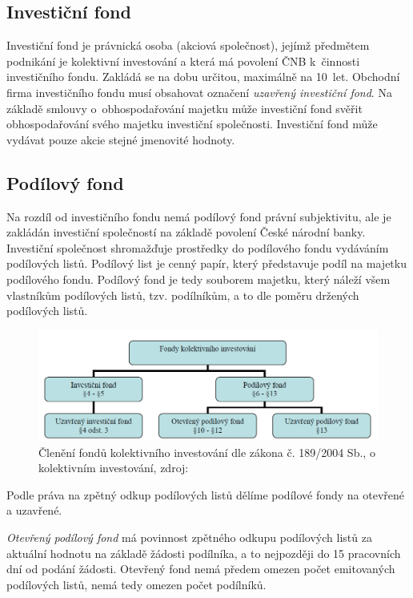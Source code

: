 \documentclass[a4paper,12pt]{article}
\begin{document}
\subsection{Investiční fond}
Investiční fond je právnická osoba (akciová společnost), jejímž předmětem podnikání je kolektivní investování a která má povolení ČNB k~činnosti investičního fondu. Zakládá se na dobu určitou, maximálně na 10~let. Obchodní firma investičního fondu musí obsahovat označení \emph{uzavřený investiční fond}. Na základě smlouvy o~obhospodařování majetku může investiční fond svěřit obhospodařování svého majetku investiční společnosti. Investiční fond může vydávat pouze akcie stejné jmenovité hodnoty.

\subsection{Podílový fond}
Na rozdíl od investičního fondu nemá podílový fond právní subjektivitu, ale je zakládán investiční společností na základě povolení České národní banky. Investiční společnost shromažďuje prostředky do podílového fondu vydáváním podílových listů. Podílový list je cenný papír, který představuje podíl na majetku podílového fondu. Podílový fond je tedy souborem majetku, který náleží všem vlastníkům podílových listů, tzv. podílníkům, a to dle poměru držených podílových listů.  

\begin{figure}[htb]
\centering
\includegraphics[width=\textwidth]{deleni.png}
\caption{Členění fondů kolektivního investování dle zákona č. 189/2004 Sb., o kolektivním investování, zdroj: \cite{dp}}
\end{figure}

Podle práva na zpětný odkup podílových listů dělíme podílové fondy na otevřené a uzavřené.

\emph{Otevřený podílový fond} má povinnost zpětného odkupu podílových listů za aktuální hodnotu na základě žádosti podílníka, a to nejpozději do 15 pracovních dní od podání žádosti. Otevřený fond nemá předem omezen počet emitovaných podílových listů, nemá tedy omezen počet podílníků.
\end{document}
